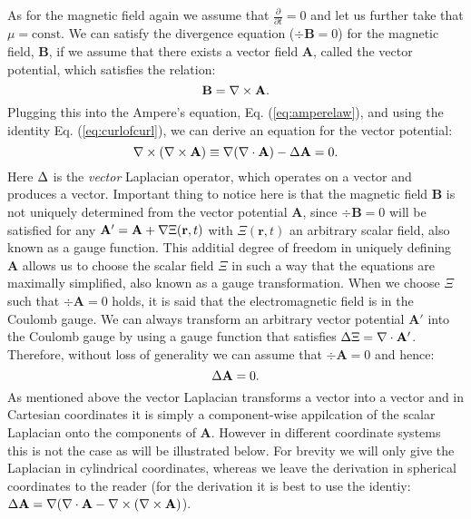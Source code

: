 As for the magnetic field again we assume that $ \frac{\partial}{\partial t} = 0 $ and let us further take that $\mu = \text{const}$. We can satisfy the divergence equation ($\div \bm{B} = 0 $) for the magnetic field, $\bm{B}$, if we assume that there exists a vector field $\bm{A}$, called the vector potential, which satisfies the relation: 
\begin{equation*}
  \mathbf{B} = \mathbf{\nabla}\times \mathbf{A}.
\end{equation*}
Plugging this into the Ampere's equation, Eq. (\ref{eq:amperelaw}), and using the identity Eq. (\ref{eq:curlofcurl}), we can derive an equation for the vector potential: 
\begin{equation*}
  \mathbf{\nabla}\times (\mathbf{\nabla}\times \mathbf{A}) \equiv \mathbf{\nabla}(\mathbf{\nabla}\cdot \mathbf{A})-\Delta{\mathbf{A}} = 0.
\end{equation*}
Here $\Delta$ is the \emph{vector} Laplacian operator, which operates on a vector and produces a vector. Important thing to notice here is that the magnetic field $\bm{B}$ is not uniquely determined from the vector potential $\bm{A}$, since $\div{\bm{B}}=0$ will be satisfied for any $\mathbf{A'} = \mathbf{A}+\mathbf{\nabla}{\Xi(\mathbf{r},t)}$ with $\Xi(\bm{r},t)$ an arbitrary scalar field, also known as a gauge function. This additial degree of freedom in uniquely defining $\bm{A}$ allows us to choose the scalar field $\Xi$ in such a way that the equations are maximally simplified, also known as a gauge transformation. When we choose $\Xi$ such that $\div \bm{A} = 0 $ holds, it is said that the electromagnetic field is in the Coulomb gauge. We can always transform an arbitrary vector potential $\bm{A'}$ into the Coulomb gauge by using a gauge function that satisfies $\Delta \Xi = \mathbf{\nabla}\cdot \mathbf{A'}$. Therefore, without loss of generality we can assume that $\div {\bm{A}= 0 }$ and hence:
\begin{equation*}
  \Delta \mathbf{A} = 0.
\end{equation*}
As mentioned above the vector Laplacian transforms a vector into a vector and in Cartesian coordinates it is simply a component-wise appilcation of the scalar Laplacian onto the components of $\bm{A}$. However in different coordinate systems this is not the case as will be illustrated below. For brevity we will only give the Laplacian in cylindrical coordinates, whereas we leave the derivation in spherical coordinates to the reader (for the derivation it is best to use the identiy: $\Delta \mathbf{A} = \mathbf{\nabla} (\mathbf{\nabla}\cdot{\mathbf{A}}-\mathbf{\nabla}\times(\mathbf{\nabla}\times \mathbf{A})$).

